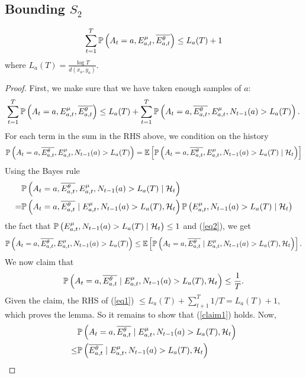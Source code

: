 \documentclass[11pt]{article}
\begin{document}
\subsection{Bounding $S_2$}
\begin{lemma}\label{B}
$$\sum_{t=1}^T  \mathbb{P}\left( A_t = a, E^{\mu}_{a,t}, \overline{E^{\theta}_{a,t}} \right)
\le L_a(T)+1$$
where $L_a(T) = \frac{\log T}{d(x_a,y_a)}$.
\end{lemma}
\begin{proof}First, we make sure that we have taken enough samples of $a$:
\begin{equation}\label{eq1}\sum_{t=1}^T  \mathbb{P}\left( A_t = a, E^{\mu}_{a,t}, \overline{E^{\theta}_{a,t}} \right) 
    \le L_a(T) + \sum_{t=1}^T  \mathbb{P}\left( A_t = a,  \overline{E^{\theta}_{a,t}}, E^{\mu}_{a,t}, N_{t-1}(a) > L_a(T) \right).\end{equation}
    For each term in the sum in the RHS above, we condition on the history
    \begin{equation}\label{eq2}\mathbb{P}\left( A_t = a, \overline{E^{\theta}_{a,t}}, E^{\mu}_{a,t}, N_{t-1}(a) > L_a(T) \right) =  \mathbb{E}\left[ \mathbb{P}\left( A_t = a,  \overline{E^{\theta}_{a,t}}, E^{\mu}_{a,t}, N_{t-1}(a) > L_a(T)\mid \mathcal{H}_t \right) \right]
    \end{equation}
Using the Bayes rule
    \begin{align*}&\mathbb{P}\left( A_t = a,  \overline{E^{\theta}_{a,t}}, E^{\mu}_{a,t}, N_{t-1}(a) > L_a(T)\mid \mathcal{H}_t \right) \\= &\mathbb{P}\left( A_t = a, \overline{E^{\theta}_{a,t}}\mid E^{\mu}_{a,t}, N_{t-1}(a) > L_a(T), \mathcal{H}_t \right)\mathbb{P}\left( E^{\mu}_{a,t}, N_{t-1}(a) > L_a(T)\mid \mathcal{H}_t \right)\end{align*}
    the fact that $\mathbb{P}\left( E^{\mu}_{a,t}, N_{t-1}(a) > L_a(T)\mid \mathcal{H}_t \right)\le 1$ and (\ref{eq2}), we get
    $$ \mathbb{P}\left( A_t = a, \overline{E^{\theta}_{a,t}}, E^{\mu}_{a,t}, N_{t-1}(a) > L_a(T) \right)
    \le \mathbb{E}\left[ \mathbb{P}\left( A_t = a, \overline{E^{\theta}_{a,t}}\mid E^{\mu}_{a,t}, N_{t-1}(a) > L_a(T), \mathcal{H}_t \right) \right].$$
We now claim that 
\begin{equation}\label{claim1}\mathbb{P}\left( A_t = a, \overline{E^{\theta}_{a,t}}\mid E^{\mu}_{a,t}, N_{t-1}(a) > L_a(T), \mathcal{H}_t \right) \le \frac{1}{T}.\end{equation}
Given the claim, the RHS of (\ref{eq1}) $\le L_a(T) + \sum_{t+1}^T 1/T = L_a(T) +1$, which proves the lemma. So it remains to show that (\ref{claim1}) holds. Now,
\begin{align}
    &\prob{A_t = a, \overline{E^{\theta}_{a,t}}\mid E^{\mu}_{a,t}, N_{t-1}(a) > L_a(T), \history_t}\\
    \le& \prob{ \overline{E^{\theta}_{a,t}}\mid E^{\mu}_{a,t}, N_{t-1}(a) > L_a(T), \history_t}\\

\end{align}
\end{proof}
\end{document}
